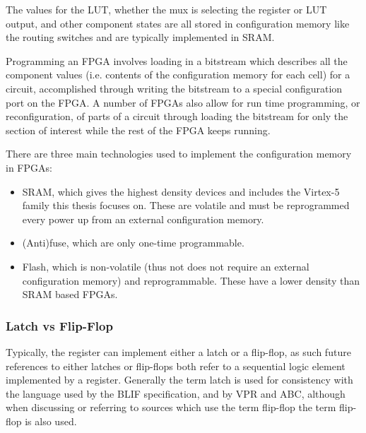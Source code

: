 \documentclass[12pt,final,oneside]{dwThesis} %
\begin{document}
   The values for the \gls{LUT}, whether the \gls{mux} is selecting the
   register or \gls{LUT} output, and other component states are all stored in
   configuration memory like the routing switches and are typically implemented
   in \gls{SRAM}.
   
   Programming an \gls{FPGA} involves loading in a bitstream which describes
   all the component values (i.e. contents of the configuration memory for each
   cell) for a circuit, accomplished through writing the bitstream to a special
   configuration port on the \gls{FPGA}. A number of \glspl{FPGA} also allow
   for run time programming, or reconfiguration, of parts of a circuit through
   loading the bitstream for only the section of interest while the rest of the
   \gls{FPGA} keeps running.

   There are three main
   technologies used to implement the configuration memory in \glspl{FPGA}:

   \begin{itemize}

      \item \gls{SRAM}, which gives the highest density devices and includes
         the Virtex-5 family this thesis focuses on. These are volatile and
         must be reprogrammed every power up from an external configuration
         memory.
      \item (Anti)fuse, which are only one-time programmable.
      \item Flash, which is non-volatile (thus not does not require an external
         configuration memory) and reprogrammable. These have a lower
         density than \gls{SRAM} based \glspl{FPGA}\cite{FPGAArch}.

   \end{itemize}
   \subsubsection{Latch vs Flip-Flop}
   Typically, the register can implement either a latch or a flip-flop,
   as such future references to either latches or flip-flops both refer to a sequential logic element 
   implemented by a register.
   Generally the term latch is used for consistency with the language used by
   the \gls{BLIF} specification, and by \gls{VPR} and \gls{ABC}, although when discussing or referring to sources
   which use the term flip-flop the term flip-flop is also used.
   
\end{document}
